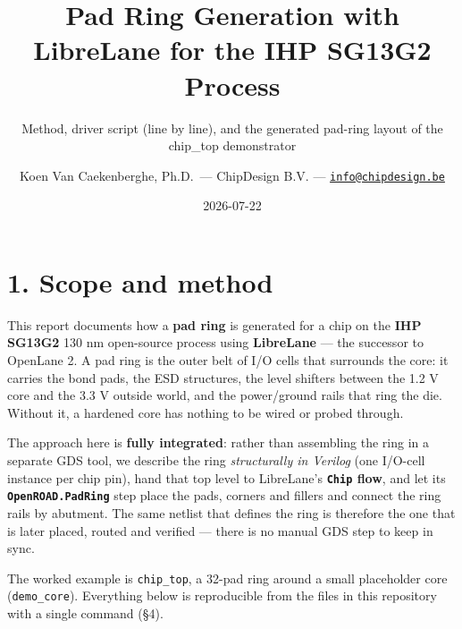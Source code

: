 \documentclass[
  11pt,
  a4paper,
]{article}
\title{Pad Ring Generation with LibreLane for the IHP SG13G2 Process}
\subtitle{Method, driver script (line by line), and the generated
pad-ring layout of the chip\_top demonstrator}
\author{Koen Van Caekenberghe, Ph.D.~--- ChipDesign B.V. ---
\href{mailto:info@chipdesign.be}{\nolinkurl{info@chipdesign.be}}}
\date{2026-07-22}
\begin{document}
\maketitle

{
\hypersetup{linkcolor=}
\setcounter{tocdepth}{3}
\tableofcontents
}
\hypertarget{scope-and-method}{%
\section{1. Scope and method}\label{scope-and-method}}

This report documents how a \textbf{pad ring} is generated for a chip on
the \textbf{IHP SG13G2} 130 nm open-source process using
\textbf{LibreLane} --- the successor to OpenLane 2. A pad ring is the
outer belt of I/O cells that surrounds the core: it carries the bond
pads, the ESD structures, the level shifters between the 1.2 V core and
the 3.3 V outside world, and the power/ground rails that ring the die.
Without it, a hardened core has nothing to be wired or probed through.

The approach here is \textbf{fully integrated}: rather than assembling
the ring in a separate GDS tool, we describe the ring \emph{structurally
in Verilog} (one I/O-cell instance per chip pin), hand that top level to
LibreLane's \textbf{\texttt{Chip} flow}, and let its
\textbf{\texttt{OpenROAD.PadRing}} step place the pads, corners and
fillers and connect the ring rails by abutment. The same netlist that
defines the ring is therefore the one that is later placed, routed and
verified --- there is no manual GDS step to keep in sync.

The worked example is \texttt{chip\_top}, a 32-pad ring around a small
placeholder core (\texttt{demo\_core}). Everything below is reproducible
from the files in this repository with a single command (§4).
\end{document}
